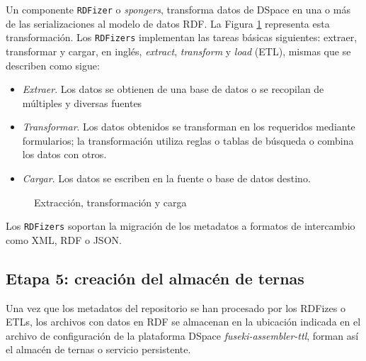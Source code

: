 Un componente \texttt{RDFizer} \cite{RDFizer} o \textit{spongers}, transforma datos de DSpace en una o m\'as de las serializaciones al modelo de datos RDF. La Figura \ref{etl-diagrama} representa esta transformaci\'on. Los \texttt{RDFizers} implementan  las tareas b\'asicas siguientes: extraer, transformar y cargar, en ingl\'es, \emph{extract}, \emph{transform} y \emph{load} (ETL), mismas que se describen como sigue: 

\begin{itemize}
    \item \textit{Extraer}. Los datos se obtienen de una base de datos o se recopilan de m\'ultiples y diversas fuentes 
    
    \item \textit{Transformar}. Los datos obtenidos se transforman en los requeridos mediante formularios; la transformaci\'on utiliza reglas o tablas de b\'usqueda o combina los datos con otros.
    
    \item \textit{Cargar}. Los datos se escriben en la fuente o base de datos destino. 
\end{itemize}

\begin{figure}[!ht]
	\centering
    \caption{Extracci\'on, transformaci\'on y carga}
    \label{etl-diagrama}
\end{figure}

Los \texttt{RDFizers} soportan la migraci\'on de los metadatos a formatos de intercambio como XML, RDF o JSON. 

\subsection{Etapa 5: creaci\'on del almac\'en de ternas}

Una vez que los metadatos del repositorio se han procesado por los RDFizes o ETLs, los archivos con datos en RDF se almacenan en la ubicaci\'on indicada en el archivo de configuraci\'on de la plataforma DSpace \textit{fuseki-assembler-ttl}, forman as\'i el almac\'en de ternas o servicio persistente.

